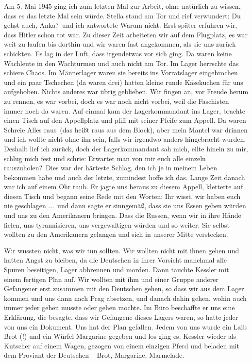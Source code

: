 Am 5. Mai 1945 ging ich zum letzten Mal zur Arbeit, ohne natürlich zu wissen, dass es das letzte Mal sein würde. Stella stand am Tor und rief verwundert: \glqq Du gehst auch, Anka?\grqq~und ich antwortete \glqq Warum nicht\grqq. Erst später erfuhren wir, dass Hitler schon tot war. Zu dieser Zeit arbeiteten wir auf dem Flugplatz, es war weit zu laufen bis dorthin und wir waren fast angekommen, als sie uns zurück schickten. Es lag in der Luft, dass irgendetwas vor sich ging. Da waren keine Wachleute in den Wachtürmen und auch nicht am Tor. Im Lager herrschte das schiere Chaos. Im Männerlager waren sie bereits ins Vorratslager eingebrochen und ein paar Tschechen (da waren drei) hatten kleine runde Käsekuchen für uns aufgehoben. Nichts anderes war übrig geblieben. Wir fingen an, vor Freude herum zu rennen, es war vorbei, doch es war noch nicht vorbei, weil die Faschisten immer noch da waren. Auf einmal kam der Lagerkommandant ins Lager, brachte einen Tisch auf den Appellplatz und pfiff mit seiner Pfeife zum Appell. Da waren Schreie \glqq Alles raus\grqq~(das heißt raus aus dem Block), aber mein Mantel war drinnen und ich wollte nicht ohne ihn sein, falls wir irgendwo anders hingebracht wurden. Deshalb lief ich zurück, doch der Lagerkommandant sah mich, eilte hinein zu mir, schlug mich fest und schrie: \glqq Erwartet man von mir euch alle einzeln rauszuholen?\grqq~Dies war der härteste Schlag, den ich je in meinem Leben bekommen habe und auch der letzte, zumindest hoffe ich das. Lange Zeit danach war ich auf einem Ohr taub. Er jagte uns heraus zu diesem Appell, kletterte auf diesen Tisch und begann seine Rede mit den Worten: \glqq Ihr wisst, wir haben euch nie geschlagen ...\grqq~und dann sagte er sinngemäß, dass sie uns Essen geben würden und uns zu den Amerikanern bringen. Dass die Russen, wenn wir in ihre Hände fielen, uns tyrannisieren, uns vergewaltigen würden und so weiter. Sie selbst wollten zu den Amerikanern gelangen und sich in unserer Mitte verstecken. 

Wir wussten nicht, was wir tun sollten. Wir wollten nicht mit ihnen gehen und hatten Angst zu bleiben, da die Deutschen in ihrer Vorsicht manchmal alle Spuren beseitigen, Lager abbrennen und morden. Dann tauchte Kessler mit einem fertigen Plan auf. Wir wollten mit ihm und einer Gruppe anderer Gefangener erst zusammen mit den Deutschen gehen, so dass wir aus dem Lager kommen und uns dann nach Prag absetzen, und danach dahin gehen, wohin auch immer jeder gehen musste oder gehen mochte. Im Büro beschaffte er uns eine Erklärung, die besagte, dass wir Gefangene dieses Lagers waren, so hatte jeder von uns ein Dokument. Uns hat der Plan gefallen. Jedem von uns wurde ein Laib Brot (!) und ein Würfel Margarine gegeben und los ging es. Kessler wieder als Kutscher auf einem Wagen, gezogen von einem einzigen Pferd und beladen mit dem Proviant der Deutschen -- Brot, Margarine, Marmelade.

